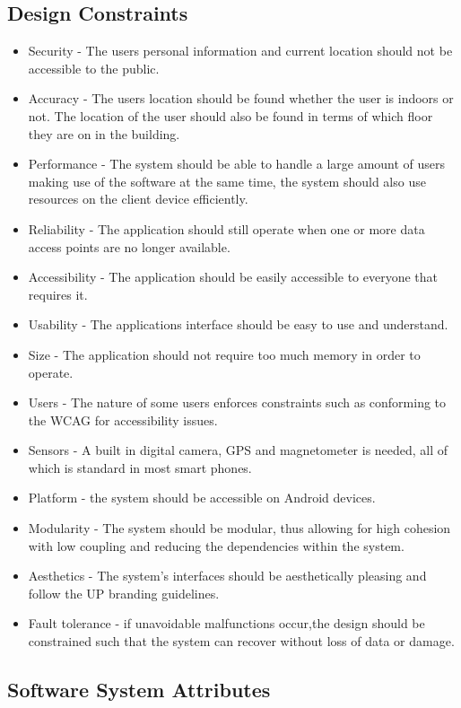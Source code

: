 \documentclass{article}
\begin{document}
	\subsection{Design Constraints}
		\begin{itemize}
				\item Security  - The users personal information and current location should not be accessible to the public.
				\item Accuracy - The users location should be found whether the user is indoors or not. The location of the user should also be found in terms of which floor they are on in the building.
				\item Performance - The system should be able to handle a large amount of users making use of the software at the same time, the system should also use resources on the client device efficiently.
				\item Reliability - The application should still operate when one or more data access points are no longer available.
				\item Accessibility - The application should be easily accessible to everyone that requires it.
				\item Usability - The applications interface should be easy to use and understand.
				\item Size - The application should not require too much memory in order to operate.
				\item Users - The nature of some users enforces constraints such as conforming to the WCAG for accessibility issues.
				\item Sensors - A built in digital camera, GPS and magnetometer is needed, all of which is standard in most smart phones.
				\item Platform - the system should be accessible on  Android  devices.
				\item Modularity - The system should be modular, thus allowing for high cohesion with low coupling and reducing the dependencies within the system.
				\item Aesthetics - The system's interfaces should be aesthetically pleasing and follow the UP branding guidelines.
				\item Fault tolerance - if unavoidable malfunctions occur,the design should be constrained such that the system can recover without loss of data or damage.
				
			\end{itemize}
	
	\subsection{Software System Attributes}
\end{document}
